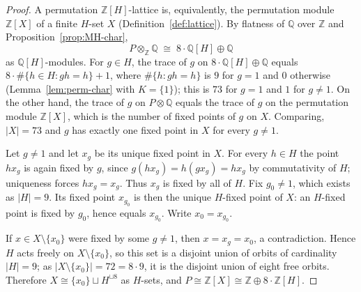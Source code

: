 \documentclass[12pt,a4paper]{article}
\theoremstyle{definition}
\begin{document}
\begin{proof}
%

A permutation \(\mathbb{Z}[H]\)-lattice is, equivalently, the
permutation module \(\mathbb{Z}[X]\) of a finite \(H\)-set \(X\)
(Definition~\ref{def:lattice}).  By flatness of \(\mathbb{Q}\) over
\(\mathbb{Z}\) and Proposition~\ref{prop:MH-char},
\[
P \otimes_{\mathbb{Z}} \mathbb{Q} \;\cong\;
8 \cdot \mathbb{Q}[H] \oplus \mathbb{Q}
\]
as \(\mathbb{Q}[H]\)-modules.  For \(g \in H\), the trace of \(g\)
on \(8\cdot\mathbb{Q}[H] \oplus \mathbb{Q}\) equals
\(8 \cdot \#\{h \in H : gh = h\} + 1\), where \(\#\{h : gh = h\}\)
is \(9\) for \(g = 1\) and \(0\) otherwise (Lemma~\ref{lem:perm-char}
with \(K = \{1\}\)); this is \(73\) for \(g = 1\) and \(1\) for
\(g \neq 1\).  On the other hand, the trace of \(g\) on
\(P \otimes \mathbb{Q}\) equals the trace of \(g\) on the permutation
module \(\mathbb{Z}[X]\), which is the number of fixed points of \(g\)
on \(X\).  Comparing, \(|X| = 73\) and \(g\) has exactly one fixed
point in \(X\) for every \(g \neq 1\).

Let \(g \neq 1\) and let \(x_g\) be its unique fixed point in \(X\).
For every \(h \in H\) the point \(h x_g\) is again fixed by \(g\),
since \(g (h x_g) = h (g x_g) = h x_g\) by commutativity of \(H\);
uniqueness forces \(h x_g = x_g\).  Thus \(x_g\) is fixed by all of
\(H\).  Fix \(g_0 \neq 1\), which exists as \(|H| = 9\).  Its fixed
point \(x_{g_0}\) is then the unique \(H\)-fixed point of \(X\): an
\(H\)-fixed point is fixed by \(g_0\), hence equals \(x_{g_0}\).
Write \(x_0 = x_{g_0}\).

If \(x \in X \setminus \{x_0\}\) were fixed by some \(g \neq 1\),
then \(x = x_g = x_0\), a contradiction.  Hence \(H\) acts freely
on \(X \setminus \{x_0\}\), so this set is a disjoint union of orbits
of cardinality \(|H| = 9\); as \(|X \setminus \{x_0\}| = 72
= 8 \cdot 9\), it is the disjoint union of eight free orbits.
Therefore \(X \cong \{x_0\} \sqcup H^{\sqcup 8}\) as \(H\)-sets,
and \(P \cong \mathbb{Z}[X] \cong \mathbb{Z} \oplus
8 \cdot \mathbb{Z}[H]\).
\end{proof}
\end{document}
